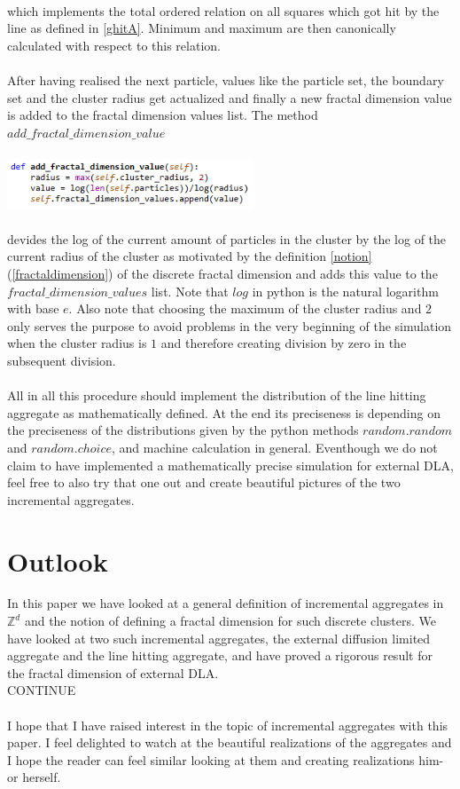 \documentclass[12pt,a4paper]{scrartcl}
\numberwithin{equation}{subsection}
\newcommand{\Z}{\mathbb{Z}} %
\newcommand{\1}{\mathbbm{1}}
\numberwithin{equation}{section}
\theoremstyle{definition}
\begin{document}
\\
which implements the total ordered relation on all squares which got hit by the line as defined in \ref{ghitA}. Minimum and maximum are then canonically calculated with respect to this relation. \\
\\After having realised the next particle, values like the particle set, the boundary set and the cluster radius get actualized and finally a new fractal dimension value is added to the fractal dimension values list. The method $\mathit{add\_fractal\_dimension\_value}$ \\
\\
\includegraphics[height=1.5cm]{images/code-snippets/fractaldimension.png} \\
\\
devides the log of the current amount of particles in the cluster by the log of the current radius of the cluster as motivated by the definition \ref{notion} (\ref{fractaldimension}) of the discrete fractal dimension and adds this value to the $\mathit{fractal\_dimension\_values}$ list. Note that $\mathit{log}$ in python is the natural logarithm with base $e$. Also note that choosing the maximum of the cluster radius and $2$ only serves the purpose to avoid problems in the very beginning of the simulation when the cluster radius is $1$ and therefore creating division by zero in the subsequent division.\\
\\All in all this procedure should implement the distribution of the line hitting aggregate as mathematically defined. At the end its preciseness is depending on the preciseness of the distributions given by the python methods $\mathit{random.random}$ and $\mathit{random.choice}$, and machine calculation in general. Eventhough we do not claim to have implemented a mathematically precise simulation for external DLA, feel free to also try that one out and create beautiful pictures of the two incremental aggregates. 

\newpage

\section{Outlook}
In this paper we have looked at a general definition of incremental aggregates in $\Z^d$ and the notion of defining a fractal dimension for such discrete clusters. We have looked at two such incremental aggregates, the external diffusion limited aggregate and the line hitting aggregate, and have proved a rigorous result for the fractal dimension of external DLA.\\ 
CONTINUE\\
\\I hope that I have raised interest in the topic of incremental aggregates with this paper. I feel delighted to watch at the beautiful realizations of the aggregates and I hope the reader can feel similar looking at them and creating realizations him- or herself. 
\end{document}

